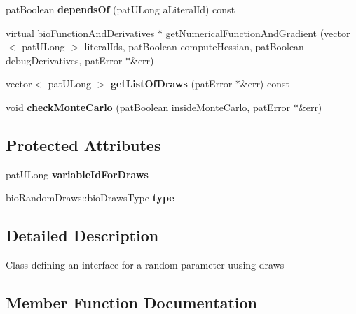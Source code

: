 \begin{DoxyCompactItemize}
pat\+Boolean {\bfseries depends\+Of} (pat\+U\+Long a\+Literal\+Id) const
\item 
virtual \hyperlink{classbio_function_and_derivatives}{bio\+Function\+And\+Derivatives} $\ast$ \hyperlink{classbio_arith_random_a6f422273cd162e5d7d5e6d1d7a7ddcad}{get\+Numerical\+Function\+And\+Gradient} (vector$<$ pat\+U\+Long $>$ literal\+Ids, pat\+Boolean compute\+Hessian, pat\+Boolean debug\+Derivatives, pat\+Error $\ast$\&err)
\item 
\mbox{\label{classbio_arith_random_aaeddba98a82767cc3d05b01904350acb}} 
vector$<$ pat\+U\+Long $>$ {\bfseries get\+List\+Of\+Draws} (pat\+Error $\ast$\&err) const
\item 
\mbox{\label{classbio_arith_random_aa6f751502c47dc7030fb451cc3317a4d}} 
void {\bfseries check\+Monte\+Carlo} (pat\+Boolean inside\+Monte\+Carlo, pat\+Error $\ast$\&err)
\end{DoxyCompactItemize}
\subsection*{Protected Attributes}
\begin{DoxyCompactItemize}
\item 
\mbox{\label{classbio_arith_random_a2370aa514ceefb3834a485daab8d8d9f}} 
pat\+U\+Long {\bfseries variable\+Id\+For\+Draws}
\item 
\mbox{\label{classbio_arith_random_ac09cba65919ec62338570a8a25994f0f}} 
bio\+Random\+Draws\+::bio\+Draws\+Type {\bfseries type}
\end{DoxyCompactItemize}


\subsection{Detailed Description}
Class defining an interface for a random parameter uusing draws 

\subsection{Member Function Documentation}
\mbox{\label{classbio_arith_random_a947f100ddb8037bf424d343faee56b83}} 
